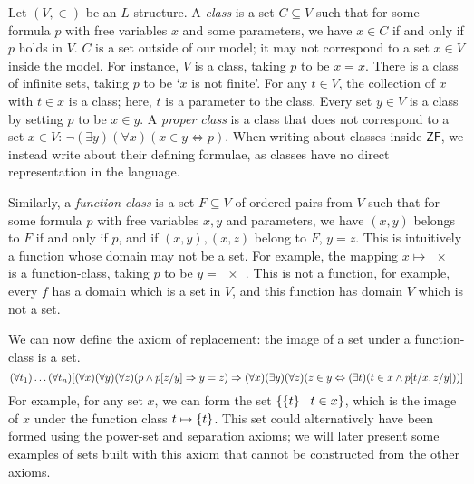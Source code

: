 \begin{enumerate}
    Let \( (V, \in) \) be an \( L \)-structure.
    A \emph{class} is a set \( C \subseteq V \) such that for some formula \( p \) with free variables \( x \) and some parameters, we have \( x \in C \) if and only if \( p \) holds in \( V \).
    \( C \) is a set outside of our model; it may not correspond to a set \( x \in V \) inside the model.
    For instance, \( V \) is a class, taking \( p \) to be \( x = x \).
    There is a class of infinite sets, taking \( p \) to be `\( x \) is not finite'.
    For any \( t \in V \), the collection of \( x \) with \( t \in x \) is a class; here, \( t \) is a parameter to the class.
    Every set \( y \in V \) is a class by setting \( p \) to be \( x \in y \).
    A \emph{proper class} is a class that does not correspond to a set \( x \in V \): \( \neg(\exists y)(\forall x)(x \in y \Leftrightarrow p) \).
    When writing about classes inside \( \mathsf{ZF} \), we instead write about their defining formulae, as classes have no direct representation in the language.

    Similarly, a \emph{function-class} is a set \( F \subseteq V \) of ordered pairs from \( V \) such that for some formula \( p \) with free variables \( x, y \) and parameters, we have \( (x, y) \) belongs to \( F \) if and only if \( p \), and if \( (x, y), (x, z) \) belong to \( F \), \( y = z \).
    This is intuitively a function whose domain may not be a set.
    For example, the mapping \( x \mapsto \qty{x} \) is a function-class, taking \( p \) to be \( y = \qty{x} \).
    This is not a function, for example, every \( f \) has a domain which is a set in \( V \), and this function has domain \( V \) which is not a set.

    We can now define the axiom of replacement: the image of a set under a function-class is a set.
    \[ (\forall t_1)\dots(\forall t_n)\qty[(\forall x)(\forall y)(\forall z)(p \wedge p[z/y] \Rightarrow y = z) \Rightarrow (\forall x)(\exists y)(\forall z)(z \in y \Leftrightarrow (\exists t)(t \in x \wedge p[t/x,z/y]))] \]
    For example, for any set \( x \), we can form the set \( \qty{\qty{t} \mid t \in x} \), which is the image of \( x \) under the function class \( t \mapsto \qty{t} \).
    This set could alternatively have been formed using the power-set and separation axioms; we will later present some examples of sets built with this axiom that cannot be constructed from the other axioms.
\end{enumerate}
